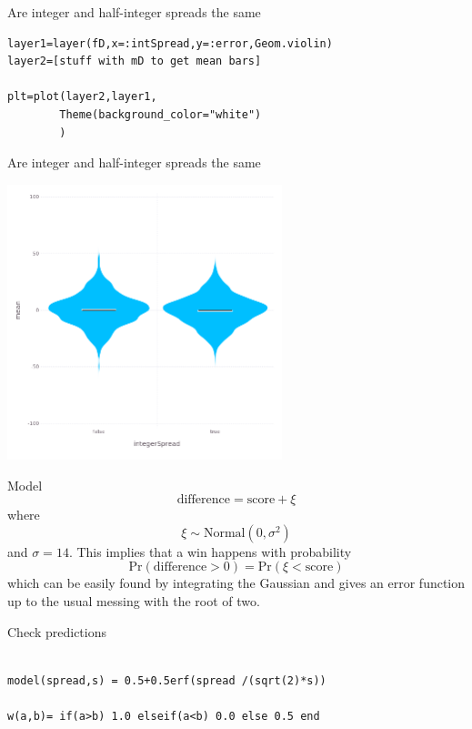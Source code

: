 \documentclass{beamer}
\begin{document}
\begin{frame}[fragile]{Are integer and half-integer spreads the same}
  \begin{lstlisting}
layer1=layer(fD,x=:intSpread,y=:error,Geom.violin)
layer2=[stuff with mD to get mean bars]

plt=plot(layer2,layer1,
        Theme(background_color="white")
        )
\end{lstlisting}
\end{frame}


\begin{frame}{Are integer and half-integer spreads the same}
  \begin{center}
  \includegraphics[width=8cm]{integerSpread.png}
\end{center}
  \end{frame}

\begin{frame}{Model}
\color{reddish}
  $$\mbox{difference} = \mbox{score} + \xi$$
\color{black}where\color{reddish}
$$\xi\sim\mbox{Normal}(0,\sigma^2)$$
\color{black}and\color{reddish}{} $\sigma=14$\color{black}. This implies that a win happens with probability\color{reddish}
$$\mbox{Pr}(\mbox{difference}>0)=\mbox{Pr}(\xi<\mbox{score})$$
\color{black}which can be easily found by integrating the Gaussian and gives an error function up to the usual messing with the root of two.
\end{frame}


\begin{frame}[fragile]{Check predictions}
  \begin{lstlisting}

model(spread,s) = 0.5+0.5erf(spread /(sqrt(2)*s))

w(a,b)= if(a>b) 1.0 elseif(a<b) 0.0 else 0.5 end
    
\end{lstlisting}
\end{frame}
\end{document}
